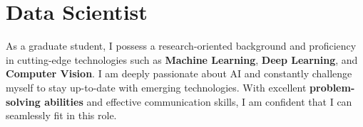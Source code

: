 
\section{Data Scientist}
\small{
    As a graduate student, I possess a research-oriented background and proficiency in cutting-edge technologies such as \textbf{Machine Learning}, \textbf{Deep Learning}, and \textbf{Computer Vision}. I am deeply passionate about AI and constantly challenge myself to stay up-to-date with emerging technologies. With excellent \textbf{problem-solving abilities} and effective communication skills, I am confident that I can seamlessly fit in this role.
}